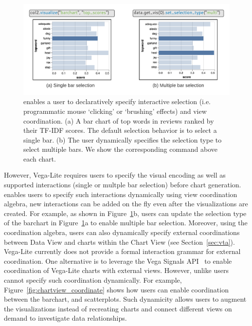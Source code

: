 
\begin{figure}[!htb] 
  \centering
  \includegraphics[width=\linewidth]{figures/chart_view_interact.pdf}
  \caption{\small \system enables a user to declaratively specify interactive selection (i.e. programmatic  mouse `clicking' or `brushing' effects) and view coordination. (a) A bar chart of top words in reviews ranked by their TF-IDF scores. The default selection  behavior is to select a single bar. (b) The user  dynamically specifies the  selection type 
  to select multiple bars. We show the corresponding \vital command above each chart. \label{fig:chartview_interact}} 
\end{figure}

However, Vega-Lite requires users to specify the visual encoding as well as supported interactions (\eg single or multple bar selection) before chart generation. \system enables users to specify such interactions dynamically using \vta view coordination algebra, \ie new interactions can be added on the fly even after the visualizations are created. For example, as shown in Figure~\ref{fig:chartview_interact}b, users can update the selection type of the barchart in Figure~\ref{fig:chartview_interact}a to enable multiple bar selection. Moreover, using the coordination algebra, users can also dynamically specify external coordinations between Data View and charts within the Chart View (see Section~\ref{sec:vta}). Vega-Lite currently does not provide a formal interaction grammar for external coordination. One alternative is to leverage the Vega Signals API~\cite{satyanarayan2015reactive} to enable coordination of Vega-Lite charts with external views.
However, unlike \system users cannot specify such coordination dynamically. For example, Figure~\ref{fig:chartview_coordinate} shows how users can enable coordination between the barchart, and scatterplots. Such dynamicity allows users to augment the visualizations instead of recreating charts and connect different views on demand to investigate data relationships. 

